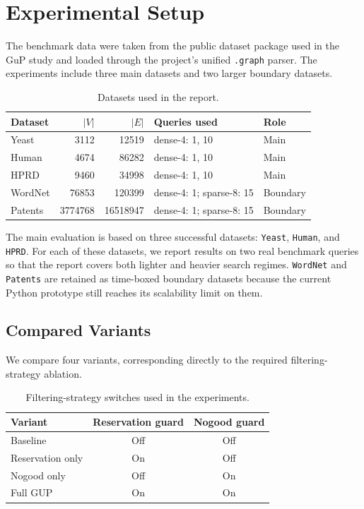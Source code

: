 \section{Experimental Setup}
\label{sec:exp-setup}

The benchmark data were taken from the public dataset package used in the GuP study and loaded through the project's unified \texttt{.graph} parser. The experiments include three main datasets and two larger boundary datasets.

\begin{table}[t]
  \caption{Datasets used in the report.}
  \label{tab:dataset-summary}
  \centering
  \footnotesize
  \setlength{\tabcolsep}{4pt}
  \begin{tabular}{lrrp{}p{}}
    \toprule
    Dataset & $|V|$ & $|E|$ & Queries used & Role \\
    \midrule
    Yeast & 3112 & 12519 & dense-4: 1, 10 & Main \\
    Human & 4674 & 86282 & dense-4: 1, 10 & Main \\
    HPRD & 9460 & 34998 & dense-4: 1, 10 & Main \\
    WordNet & 76853 & 120399 & dense-4: 1; sparse-8: 15 & Boundary \\
    Patents & 3774768 & 16518947 & dense-4: 1; sparse-8: 15 & Boundary \\
    \bottomrule
  \end{tabular}
\end{table}

The main evaluation is based on three successful datasets: \texttt{Yeast}, \texttt{Human}, and \texttt{HPRD}. For each of these datasets, we report results on two real benchmark queries so that the report covers both lighter and heavier search regimes. \texttt{WordNet} and \texttt{Patents} are retained as time-boxed boundary datasets because the current Python prototype still reaches its scalability limit on them.

\subsection{Compared Variants}

We compare four variants, corresponding directly to the required filtering-strategy ablation.

\begin{table}[t]
  \caption{Filtering-strategy switches used in the experiments.}
  \label{tab:strategy-switch}
  \centering
  \small
  \begin{tabular}{lcc}
    \toprule
    Variant & Reservation guard & Nogood guard \\
    \midrule
    Baseline & Off & Off \\
    Reservation only & On & Off \\
    Nogood only & Off & On \\
    Full GUP & On & On \\
    \bottomrule
  \end{tabular}
\end{table}

